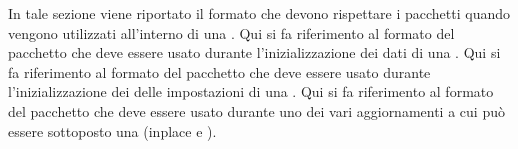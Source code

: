         In tale sezione viene riportato il formato che devono rispettare i pacchetti  quando vengono utilizzati all'interno di una .
            Qui si fa riferimento al formato del pacchetto  che deve essere usato durante l'inizializzazione dei dati di una .
            \ignoreglo{}
            Qui si fa riferimento al formato del pacchetto  che deve essere usato durante l'inizializzazione dei delle impostazioni di una .
            \ignoreglo{}
            Qui si fa riferimento al formato del pacchetto  che deve essere usato durante uno dei vari aggiornamenti a cui può essere sottoposto una  (inplace e ).
                \ignoreglo{}
                \ignoreglo{}